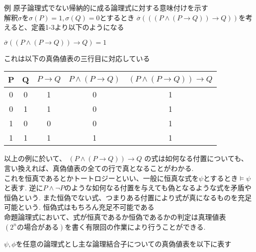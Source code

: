 \documentclass[10pt]{jarticle}
\begin{document}
	\begin{itembox}[l]{例}
	原子論理式でない帰納的に成る論理式に対する意味付けを示す \\
	解釈\(\sigma\)を\(\sigma(P) = 1 , \sigma(Q) = 0\)とするとき
	\(\overline{\sigma}(((P \land (P \to Q)) \to Q))\)を考えると、定義1-3より以下のようになる 
	
	\begin{center}
	\GapWidth=5pt
	\begin{bundle}{\( \overline{\sigma}((P \land (P \to Q)) \to Q ) = 1\)}
	\end{bundle}

	\end{center}
	
	これは以下の真偽値表の三行目に対応している 
	
	\begin{center}
		\begin{tabular}{|c|c||c|c|c|} \hline
		P & Q & \(P \to Q\) & \(P \land (P \to Q)\) & \((P \land (P \to Q)) \to Q\) \\ \hline
		0 & 0 &           1 &                      0 &                              1 \\ \hline
		0 & 1 &           1 &                      0 &                              1 \\ \hline \hline
		1 & 0 &           0 &                      0 &                              1 \\ \hline \hline
		1 & 1 & 	  1 &                      1 &                              1 \\ \hline
		\end{tabular}
	\end{center}

	\end{itembox}

	
	以上の例に於いて、 \((P \land (P \to Q)) \to Q\) の式は如何なる付置についても、\\
	言い換えれば、真偽値表の全ての行で真となることがわかる. \\
	これを恒真であるとかトートロジーといい、一般に恒真な式を\(\psi\)とするとき\(\models \psi\)と表す. 
	逆に\(P \land \lnot P\)のような如何なる付置を与えても偽となるような式を矛盾や恒偽という. 
	また恒偽でない式、つまりある付置により式が真になるものを充足可能という. 恒偽式はもちろん充足不可能である \\
	命題論理式において、式が恒真であるか恒偽であるかの判定は真理値表\\ \((2^nの場合がある)\)を書く有限回の作業により行うことができる.
		

	\newpage

	\(\psi , \phi\)を任意の論理式とし主な論理結合子についての真偽値表を以下に表す \\

	
	
\end{document}
